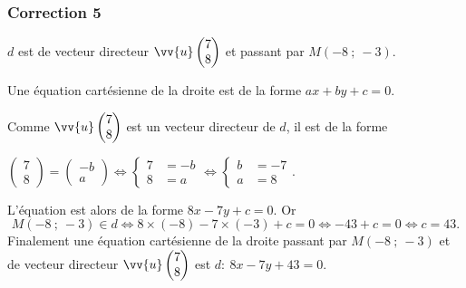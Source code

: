 \documentclass[15pt, mathserif]{beamer}
\newcommand{\vco}[2]{\begin{pmatrix} #1 \\ #2 \end{pmatrix}} %
\begin{document}
\begin{frame}
\vspace{-10mm}
	\frametitle{Correction 5}
\vspace*{2em}
$d$ est de vecteur directeur $\vv{u}\vco{7}{8}$ et passant par $M\left(-8~;~-3\right)$.

Une équation cartésienne de la droite est de la forme $ax+by+c=0$.

Comme  $\vv{u}\vco{7}{8}$ est un vecteur directeur de $d$, il est de la forme 

\smallskip

\hfil $\vco{7}{8}=\vco{-b}{a} \Leftrightarrow \begin{cases} 7& = -b \\ 8&=a \end{cases} \Leftrightarrow \begin{cases} b &= -7\\ a &=8\end{cases}.$\smallskip

 L'équation est alors de la forme $8x-7y + c = 0$. Or \[M(-8~;~-3) \in d \Leftrightarrow 8\times \left(-8\right)-7\times \left(-3\right)+c=0 \Leftrightarrow -43+c = 0 \Leftrightarrow c = 43.\] Finalement une équation cartésienne de la droite passant par $M\left(-8~;~-3\right)$ et de vecteur directeur $\vv{u}\vco{7}{8}$ est $d:~8x-7y+43=0.$\end{frame}
\end{document}

